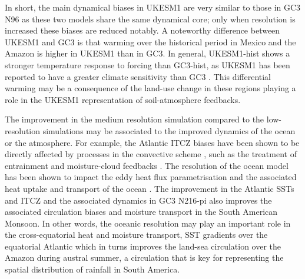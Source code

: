 In short, the main dynamical biases in UKESM1 are very similar to those in GC3 N96 as these two models  share the same dynamical core; only when resolution is increased these biases are reduced notably. A noteworthy difference between UKESM1 and GC3 is that warming over the historical period in Mexico and the Amazon is higher in UKESM1 than in GC3. In general, UKESM1-hist shows a stronger temperature response to forcing than GC3-hist, as UKESM1 has been reported to have a  greater climate sensitivity than GC3 \citep{andrews2019,sellar2019}.  This differential warming may be a consequence of the land-use change in these regions playing a role in the UKESM1 representation of soil-atmosphere feedbacks. %


The improvement in the medium resolution simulation compared to the low-resolution simulations may  be associated to the improved dynamics of the ocean or the atmosphere. %
For example, the Atlantic ITCZ biases have been shown to be directly affected by processes in the convective scheme \citep{bellucci2010}, such as the treatment of entrainment and moisture-cloud feedbacks \citep{oueslati2013,li2014}. 
The resolution of the ocean model has been shown to impact the eddy heat flux parametrisation and the associated heat uptake and transport of the ocean  \citep{kuhlbrodt2018}. The improvement in the Atlantic SSTs and ITCZ and the associated dynamics in GC3 N216-pi also improves the associated circulation biases and moisture transport in the South American Monsoon. In other words, the oceanic resolution may play an important role in the cross-equatorial heat and moisture transport, SST gradients over the equatorial Atlantic which in turns improves the land-sea circulation over the Amazon during austral summer, a circulation that is key for representing the spatial distribution of rainfall in South America.



